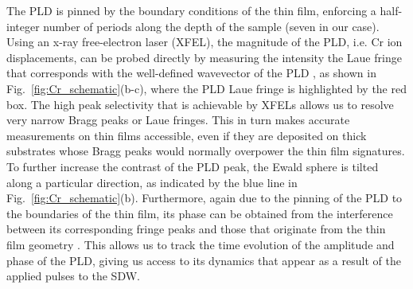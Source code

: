 The PLD is pinned by the boundary conditions of the thin film, enforcing a half-integer number of periods along the depth of the sample (seven in our case)\cite{Soh2011,Singer2016,Singer2015prb}.
Using an x-ray free-electron laser (XFEL), the magnitude of the PLD, i.e. Cr ion displacements, can be probed directly by measuring the intensity the Laue fringe that corresponds with the well-defined wavevector of the PLD \cite{Singer2015prb, Singer2015prl}, as shown in Fig.~\ref{fig:Cr_schematic}(b-c), where the PLD Laue fringe is highlighted by the red box. 
The high peak selectivity that is achievable by XFELs allows us to resolve very narrow Bragg peaks or Laue fringes. 
This in turn makes accurate measurements on thin films accessible, even if they are deposited on thick substrates whose Bragg peaks would normally overpower the thin film signatures.
To further increase the contrast of the PLD peak, the Ewald sphere is tilted along a particular direction, as indicated by the blue line in Fig.~\ref{fig:Cr_schematic}(b).
Furthermore, again due to the pinning of the PLD to the boundaries of the thin film, its phase can be obtained from the interference between its corresponding fringe peaks and those that originate from the thin film geometry \cite{Singer2015prb}.
This allows us to track the time evolution of the amplitude and phase of the PLD, giving us access to its dynamics that appear as a result of the applied pulses to the SDW.


